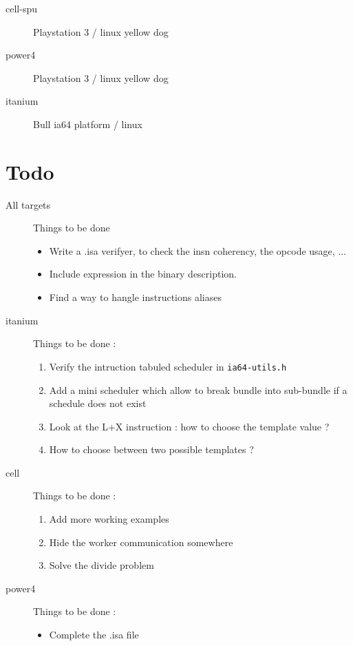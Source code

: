 \documentclass{article}
\begin{document}
\begin{description}
\item[cell-spu] Playstation 3 / linux yellow dog
\item[power4]   Playstation 3 / linux yellow dog
\item[itanium]  Bull ia64 platform / linux 
\end{description}

\section{Todo}

\begin{description}
\item[All targets] Things to be done
  \begin{itemize}
  \item Write a .isa verifyer, to check the insn coherency, the opcode
    usage, ...
  \item Include expression in the binary description.
  \item Find a way to hangle instructions aliases
  \end{itemize}
\item[itanium] Things to be done :
  \begin{enumerate}
  \item Verify the intruction tabuled scheduler in \texttt{ia64-utils.h}
  \item Add a mini scheduler which allow to break bundle into
    sub-bundle if a schedule does not exist
  \item Look at the L+X instruction : how to choose the template value ?
  \item How to choose between two possible templates ?
  \end{enumerate}
\item[cell] Things to be done :
  \begin{enumerate}
  \item Add more working examples
  \item Hide the worker communication somewhere
  \item Solve the divide problem
  \end{enumerate}
\item[power4]  Things to be done :
  \begin{itemize}
  \item Complete the .isa file
  \end{itemize}
\end{description}
\end{document}
